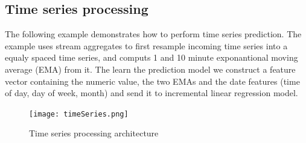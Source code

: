 \documentclass{article} %
\begin{document}
\subsection{Time series processing}

The following example demonstrates how to perform time series prediction. The example uses stream aggregates to first resample incoming time series into a equaly spaced time series, and computs 1 and 10 minute exponantional moving average (EMA) from it. The learn the prediction model we construct a feature vector containing the numeric value, the two EMAs and the date features (time of day, day of week, month) and send it to incremental linear regression model.

      \begin{figure}[h]
      \begin{center}
      \texttt{[image: timeSeries.png]}
      \end{center}
      \caption{Time series processing architecture}
      \end{figure}
\end{document}
